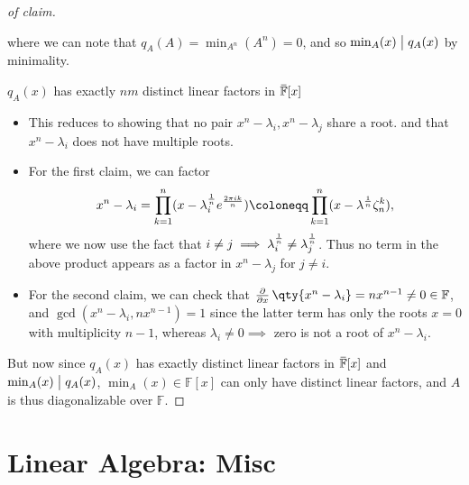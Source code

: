 \begin{solution}
\begin{proof}[of claim]
\begin{itemize}
  where we can note that \(q_A(A) = \min_{A^n}(A^n) = 0\), and so
  \(\min_A(x) \bigm|q_A(x)\) by minimality.
\end{itemize}

\begin{claim}

\(q_A(x)\) has exactly \(nm\) distinct linear factors in
\({ \mkern 1.5mu\overline{\mkern-1.5mu \mathbb{F}\mkern-1.5mu}\mkern 1.5mu }[x]\)

\end{claim}

\begin{itemize}
\item
  This reduces to showing that no pair \(x^n-\lambda_i, x^n-\lambda_j\)
  share a root. and that \(x^n-\lambda_i\) does not have multiple roots.
\item
  For the first claim, we can factor
  \begin{align*}
  x^n - \lambda_i = \prod_{k=1}^n (x - \lambda_i^{1\over n} e^{2\pi i k \over n}) \coloneqq\prod_{k=1}^n (x-\lambda^{1\over n} \zeta_n^k)
  ,\end{align*}
  where we now use the fact that
  \(i\neq j \implies \lambda_i^{1\over n} \neq \lambda_j^{1\over n}\).
  Thus no term in the above product appears as a factor in
  \(x^n - \lambda_j\) for \(j\neq i\).
\item
  For the second claim, we can check that
  \({\frac{\partial }{\partial x}\,}\qty{x^n - \lambda_i} = nx^{n-1}\neq 0\in {\mathbb{F}}\),
  and \(\gcd(x^n-\lambda_i, nx^{n-1}) = 1\) since the latter term has
  only the roots \(x=0\) with multiplicity \(n-1\), whereas
  \(\lambda_i\neq 0 \implies\) zero is not a root of \(x^n-\lambda_i\).
\end{itemize}

But now since \(q_A(x)\) has exactly distinct linear factors in
\(\mkern 1.5mu\overline{\mkern-1.5mu{\mathbb{F}}\mkern-1.5mu}\mkern 1.5mu[x]\)
and \(\min_A(x) \bigm|q_A(x)\), \(\min_A(x) \in {\mathbb{F}}[x]\) can
only have distinct linear factors, and \(A\) is thus diagonalizable over
\({\mathbb{F}}\).

\end{proof}

\end{solution}

\hypertarget{linear-algebra-misc}{%
\section{Linear Algebra: Misc}\label{linear-algebra-misc}}

